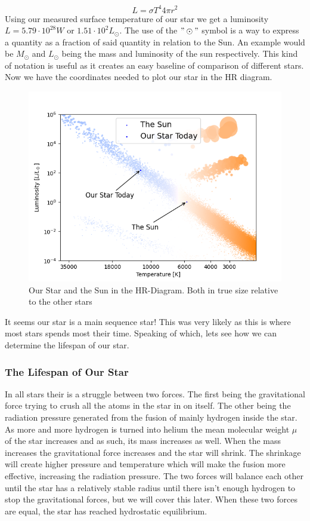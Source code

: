 \documentclass[reprint,english,notitlepage]{revtex4-2}
\begin{document}
\begin{equation} \label{eq: Luminosity final}
  L = σT^{4} 4 π r^{2}
\end{equation}
Using our measured surface temperature of our star we get a luminosity $ L = 5.79 \cdot 10^{28} W$  or $ 1.51 \cdot 10^{2} L_{\odot} $. The use of the  $ "\odot" $ symbol is a way to express a quantity as a fraction of said quantity in relation to the Sun. An example would be $ M_{⊙} $ and $ L_{⊙} $ being the mass and luminosity of the sun respectively. This kind of notation is useful as it creates an easy baseline of comparison of different stars.
Now we have the coordinates needed to plot our star in the HR diagram. 
\begin{figure}[h!]
  \centering
  \includegraphics[scale = .5]{figures/HR_diagram_Sun and Star}
  \caption{Our Star and the Sun in the HR-Diagram. Both in true size relative to the other stars}
  \label{fig: HR_Diagram_Today}
\end{figure}
It seems our star is a main sequence star! This was very likely as this is where most stars spends most their time. Speaking of which, lets see how we can determine the lifespan of our star. 

\subsubsection*{The Lifespan of Our Star}
In all stars their is a struggle between two forces. The first being the gravitational force trying to crush all the atoms in the star in on itself. The other being the radiation pressure generated from the fusion of mainly hydrogen inside the star. As more and more hydrogen is turned into helium the mean molecular weight $ μ $ of the star increases and as such, its mass increases as well. When the mass increases the gravitational force increases and the star will shrink. The shrinkage will create higher pressure and temperature which will make the fusion more effective, increasing the radiation pressure. The two forces will balance each other until the star has a relatively stable radius until there isn't enough hydrogen to stop the gravitational forces, but we will cover this later. When these two forces are equal, the star has reached hydrostatic equilibrium. 
\end{document}
